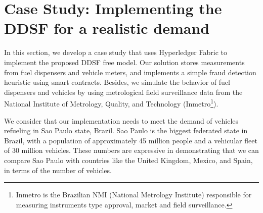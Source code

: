 \documentclass[sigplan]{acmart}
\begin{document}
% 
% 
% 

\section{Case Study: Implementing the DDSF for a realistic demand}
In this section, we develop a case study that uses Hyperledger Fabric to implement the proposed DDSF free model.
Our solution stores measurements from fuel dispensers and vehicle meters, and implements a simple fraud detection heuristic using smart contracts.
Besides, we simulate the behavior of fuel dispensers and vehicles by using metrological field surveillance data from the National Institute of Metrology, Quality, and Technology (Inmetro\footnote{Inmetro is the Brazilian NMI (National Metrology Institute) responsible for measuring instruments type approval, market and field surveillance.}).

We consider that our implementation needs to meet the demand of vehicles refueling in Sao Paulo state, Brazil.
Sao Paulo is the biggest federated state in Brazil, with a population of approximately 45 million people and a vehicular fleet of 30 million vehicles.
These numbers are expressive in demonstrating that we can compare Sao Paulo with countries like the United Kingdom, Mexico, and Spain, in terms of the number of vehicles.
\end{document}

